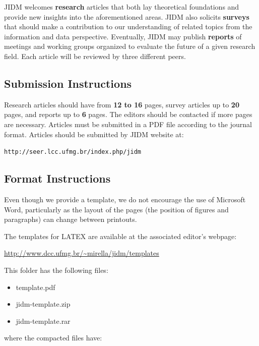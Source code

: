 \documentclass[jidm,a4paper]{jidm} %
\begin{document}
JIDM welcomes \textbf{research} articles that both lay theoretical foundations and provide new insights into the aforementioned areas. JIDM also solicits \textbf{surveys} that should make a contribution to our understanding of related topics from the information and data perspective. Eventually, JIDM may publish \textbf{reports} of meetings and working groups organized to evaluate the future of a given research field. Each article will be reviewed by three different peers. 


\subsection{Submission Instructions}

Research articles should have from \textbf{12 to 16} pages, survey articles up to \textbf{20} pages, and reports up to \textbf{6} pages. The editors should be contacted if more pages are necessary. Articles must be submitted in a PDF file according to the journal format.
Articles should be submitted by JIDM website at: 

\begin{center}
\texttt{http://seer.lcc.ufmg.br/index.php/jidm}
\end{center}



\subsection{Format Instructions}

Even though we provide a template, we do not encourage the use of Microsoft Word, particularly as the layout of the pages (the position of figures and paragraphs) can change between printouts. 

The templates for LATEX are available at the associated editor's webpage:

\begin{center}
\url{http://www.dcc.ufmg.br/~mirella/jidm/templates}
\end{center}

This folder has the following files:

\begin{itemize}
	\item template.pdf
	\item jidm-template.zip
	\item jidm-template.rar
\end{itemize}

where the compacted files have: 
\end{document}
